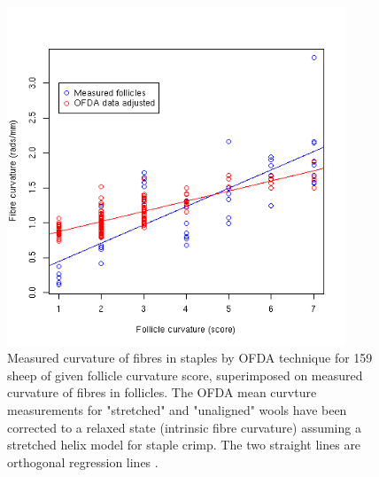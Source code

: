 %

\begin{figure}[!h]
  \centering
   \includegraphics[width=0.9\textwidth]{ovlyint.png}
  \caption{Measured curvature of fibres in staples by OFDA technique for 159 sheep of   given follicle curvature score, superimposed on measured curvature of fibres in follicles. The OFDA mean curvture measurements for "stretched" and "unaligned" wools have been corrected to a relaxed state (intrinsic fibre curvature) assuming a stretched helix model for staple crimp. The two straight lines are orthogonal regression lines .}
  \label{fig:ovlyint}
\end{figure}

%

